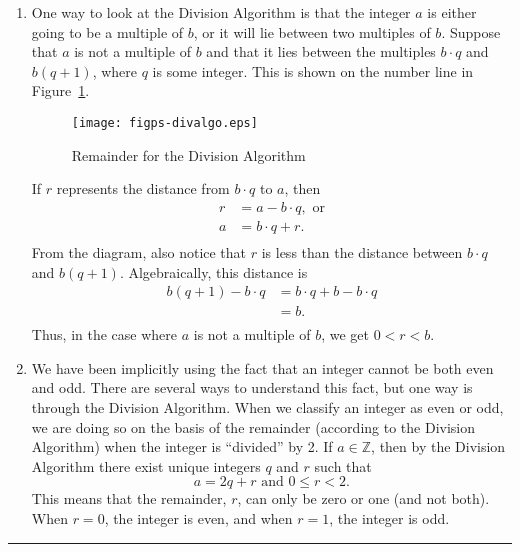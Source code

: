 \begin{enumerate}
\item One way to look at the Division Algorithm is that the integer  $a$  is either going to be a multiple of  $b$, or it will lie between two multiples of  $b$.  Suppose that  $a$  is not a multiple of  $b$ and that it lies between the multiples  $b \cdot q$  and  $b\left( {q + 1} \right)$, where $q$ is some integer.  This is shown on the number line in Figure~\ref{fig:divalgo}.
%
\begin{figure}[h]
\begin{center}
\texttt{[image: figps-divalgo.eps]}
\caption{Remainder for the Division Algorithm}\label{fig:divalgo}
\end{center}
\end{figure}

If  $r$  represents the distance from  $b \cdot q$ to  $a$, then
\[
\begin{aligned}
  r &= a - b \cdot q,\text{ or} \\ 
  a &= b \cdot q + r. \\ 
\end{aligned} 
\]
From the diagram, also notice that  $r$  is less than the distance between  $b \cdot q$
  and  $b\left( {q + 1} \right)$.  Algebraically, this distance is
\[
\begin{aligned}
  b\left( {q + 1} \right) - b \cdot q &= b \cdot q + b - b \cdot q \\ 
                                      &= b. \\ 
\end{aligned} 
\]
Thus, in the case where  $a$  is not a multiple of  $b$, we get  $0 < r < b$.

\item We have been implicitly using the fact that an integer cannot be both even and odd.  There are several ways to understand this fact, but one way is through the Division Algorithm.  When we classify an integer as even or odd, we are doing so on the basis of the remainder (according to the Division Algorithm) when the integer is ``divided'' by 2.  If  $a \in \mathbb{Z}$, then by the Division Algorithm there exist unique integers  $q$  and  $r$  such that
\[
a = 2q + r\text{  and  }0 \leq r < 2.
\]
This means that the remainder, $r$,  can only be zero or one (and not both).  When  $r = 0$, the integer is even, and when  $r = 1$, the integer is odd.
\end{enumerate}
%
\vskip3pt
\hrule

